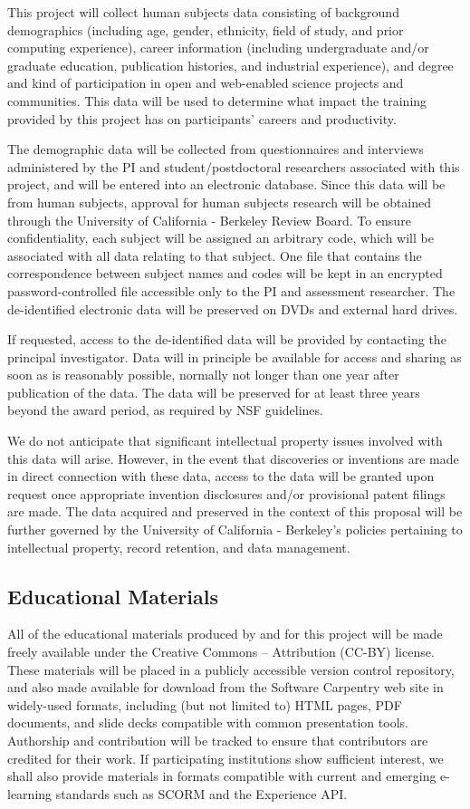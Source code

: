 \documentclass{proposalnsf}
\newlength{\up}
\begin{document}
This project will collect human subjects data consisting of background
demographics (including age, gender, ethnicity, field of study, and
prior computing experience), career information (including
undergraduate and/or graduate education, publication histories, and
industrial experience), and degree and kind of participation in open
and web-enabled science projects and communities.  This data will be
used to determine what impact the training provided by this project
has on participants' careers and productivity.

The demographic data will be collected from questionnaires and
interviews administered by the PI and student/postdoctoral researchers
associated with this project, and will be entered into an electronic
database.  Since this data will be from human subjects, approval for
human subjects research will be obtained through the University of
California - Berkeley Review Board.  To ensure confidentiality, each
subject will be assigned an arbitrary code, which will be associated
with all data relating to that subject.  One file that contains the
correspondence between subject names and codes will be kept in an
encrypted password-controlled file accessible only to the PI and
assessment researcher.  The de-identified electronic data will be
preserved on DVDs and external hard drives.

If requested, access to the de-identified data will be provided by
contacting the principal investigator. Data will in principle be
available for access and sharing as soon as is reasonably possible,
normally not longer than one year after publication of the data. The
data will be preserved for at least three years beyond the award
period, as required by NSF guidelines.

We do not anticipate that significant intellectual property issues
involved with this data will arise. However, in the event that
discoveries or inventions are made in direct connection with these
data, access to the data will be granted upon request once appropriate
invention disclosures and/or provisional patent filings are made.  The
data acquired and preserved in the context of this proposal will be
further governed by the University of California - Berkeley's policies
pertaining to intellectual property, record retention, and data
management.

\subsection*{Educational Materials}

All of the educational materials produced by and for this project will
be made freely available under the Creative Commons -- Attribution
(CC-BY) license.  These materials will be placed in a publicly
accessible version control repository, and also made available for
download from the Software Carpentry web site in widely-used formats,
including (but not limited to) HTML pages, PDF documents, and slide
decks compatible with common presentation tools.  Authorship and
contribution will be tracked to ensure that contributors are credited
for their work.  If participating institutions show sufficient
interest, we shall also provide materials in formats compatible with
current and emerging e-learning standards such as SCORM and the
Experience API.
\end{document}
